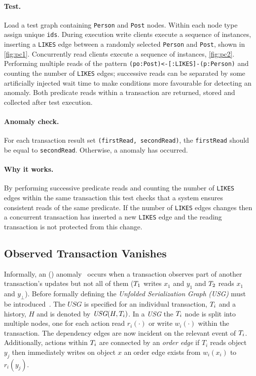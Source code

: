 \paragraph{Test.}
Load a test graph containing \texttt{Person} and \texttt{Post} nodes.
Within each node type assign unique \texttt{ids}.
During execution write clients execute a sequence of  instances, inserting a \texttt{LIKES} edge between a randomly selected \texttt{Person} and \texttt{Post}, shown in \autoref{fig:pc1}.
Concurrently read clients execute a sequence of  instances, \autoref{fig:pc2}.
Performing multiple reads of the pattern \texttt{(po:Post)<-[:LIKES]-(p:Person)} and counting the number of \texttt{LIKES} edges; successive reads can be separated by some artificially injected wait time to make conditions more favourable for detecting an anomaly.
Both predicate reads within a  transaction are returned, stored and collected after test execution.

\paragraph{Anomaly check.}
For each  transaction result set \texttt{(firstRead, secondRead)}, the \texttt{firstRead} should be equal to \texttt{secondRead}.
Otherwise, a  anomaly has occurred.

\paragraph{Why it works.}
By performing successive predicate reads and counting the number of \texttt{LIKES} edges within the same transaction this test checks that a system ensures consistent reads of the same predicate.
If the number of \texttt{LIKES} edges changes then a concurrent transaction has inserted a new \texttt{LIKES} edge and the reading transaction is not protected from this change.

\subsection{Observed Transaction Vanishes}
\label{sec:observ-trans-vanish}
Informally, an  () anomaly~\cite{DBLP:journals/pvldb/BailisDFGHS13} occurs when a transaction observes part of another transaction's updates but not all of them (\eg $T_1$ writes $x_1$ and $y_1$ and $T_2$ reads $x_1$ and $y_\bot$).
Before formally defining  the \emph{Unfolded Serialization Graph (USG)} must be introduced~\cite{adya1999weak}.
The $\textit{USG}$ is specified for an individual transaction, $T_i$ and a history, $H$ and is denoted by $\textit{USG}(H,T_i)$.
In a \emph{USG} the $T_i$ node is split into multiple nodes, one for each action read $r_i(\cdot)$ or  write $w_i(\cdot)$  within the transaction.
The dependency edges are now incident on the relevant event of $T_i$.
Additionally, actions within $T_i$ are connected by  an \emph{order edge} \eg if $T_i$ reads object $y_j$ then immediately writes on object $x$ an order edge exists from $w_i(x_i)$ to $r_i(y_j)$.

